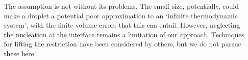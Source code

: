 The assumption is not without its problems.
The small size, potentially, could  make a droplet a potential poor approximation to an `infinite thermodynamic system',
with the finite volume errors that this can entail.
However, neglecting the nucleation at the interface remains a limitation of our approach.
Techniques for lifting the restriction have been considered by others\cite{Jarvis1975, Katz1992},
but we do not pursue these here.





